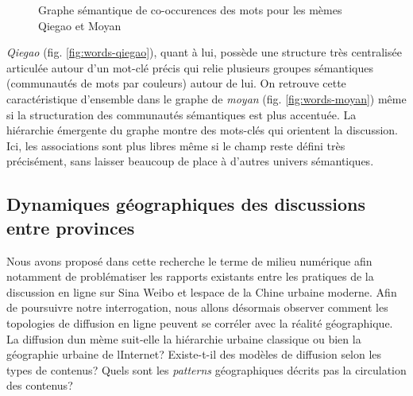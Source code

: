 \begin{figure}[h!]
    \centering
    
  \caption{
    Graphe sémantique de co-occurences des mots pour les mèmes Qiegao et Moyan
  }
\end{figure}


\textit{Qiegao} (fig. \ref{fig:words-qiegao}), quant \`a lui, possède une structure très centralisée articulée autour d{\textquoteright}un mot-clé précis qui relie plusieurs groupes sémantiques (communautés de mots par couleurs) autour de lui. On retrouve cette caractéristique d{\textquoteright}ensemble dans le graphe de \textit{moyan} (fig. \ref{fig:words-moyan}) même si la structuration des communautés sémantiques est plus accentuée. La hiérarchie émergente du graphe montre des mots-clés qui orientent la discussion. Ici, les associations sont plus libres même si le champ reste défini très précisément, sans laisser beaucoup de place à d'autres univers sémantiques.


\subsection[Dynamiques géographiques des discussions entre provinces]{Dynamiques géographiques des discussions entre provinces}

Nous avons proposé dans cette recherche le terme de milieu numérique afin notamment de problématiser les rapports existants entre les pratiques de la discussion en ligne sur Sina Weibo et l{\textquotesingle}espace de la Chine urbaine moderne. Afin de poursuivre notre interrogation, nous allons désormais observer comment les topologies de diffusion en ligne peuvent se corréler avec la réalité géographique. La diffusion d{\textquotesingle}un mème suit-elle la hiérarchie urbaine classique ou bien la géographie urbaine de l{\textquotesingle}Internet? Existe-t-il des modèles de diffusion selon les types de contenus? Quels sont les \textit{patterns }géographiques décrits pas la circulation des contenus? 

